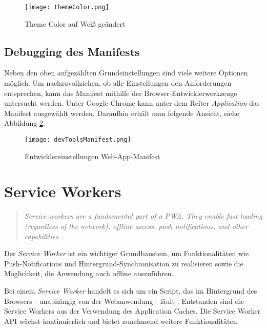 \begin{figure}[!htb]
    \texttt{[image: themeColor.png]}
    \caption{Theme Color auf Weiß geändert}
    \label{img:themeColor}
\end{figure}

\subsection{Debugging des Manifests}

Neben den oben aufgezählten Grundeinstellungen sind viele weitere Optionen möglich. Um nachzuvollziehen, ob alle Einstellungen den Anforderungen entsprechen, kann das Manifest mithilfe der Browser-Entwicklerwerkzeuge untersucht werden. Unter Google Chrome kann unter dem Reiter \textit{Application} das Manifest ausgewählt werden. Daraufhin erhält man folgende Ansicht, siehe Abbildung \ref{img:devManifest}.

\begin{figure}[!htb]
    \centering
    \texttt{[image: devToolsManifest.png]}
    \caption{Entwicklereinstellungen Web-App-Manifest}
    \label{img:devManifest}
\end{figure}


\newpage

\section{Service Workers}\label{sec:ServiceWorker}
\begin{quote}
    \textit{Service workers are a fundamental part of a PWA. They enable fast loading (regardless of the network), offline access, push notifications, and other capabilities \cite{Developers2022a}.}
\end{quote}

Der \textit{Service Worker} ist ein wichtiger Grundbaustein, um Funktionalitäten wie Push-Notifications und Hintergrund-Synchronisation zu realisieren sowie die Möglichkeit, die Anwendung auch offline auszuführen. 

Bei einem \textit{Service Worker} handelt es sich um ein Script, das im Hintergrund des Browsers - unabhängig von der Webanwendung - läuft \cite{Gaunt2021}. Entstanden sind die Service Workers aus der Verwendung des Application Caches. Die Service Worker \ac{API} wächst kontinuierlich und bietet zunehmend weitere Funktionalitäten.

